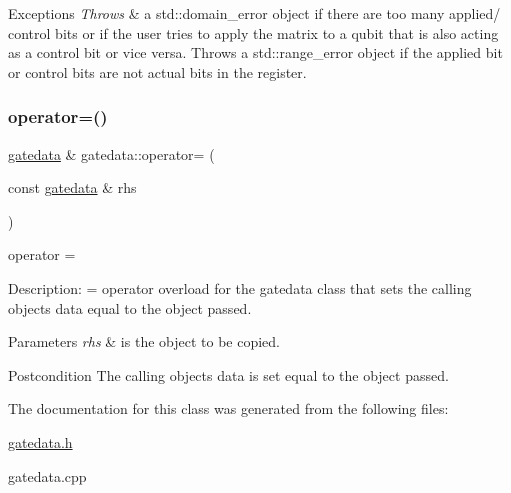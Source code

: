 \begin{DoxyExceptions}{Exceptions}
{\em Throws} & a std\+::domain\+\_\+error object if there are too many applied/ control bits or if the user tries to apply the matrix to a qubit that is also acting as a control bit or vice versa. Throws a std\+::range\+\_\+error object if the applied bit or control bits are not actual bits in the register. \\
\hline
\end{DoxyExceptions}
\mbox{\label{classgatedata_ab6386ea952bb7e620136049a5bd61211}} 
\subsubsection{\texorpdfstring{operator=()}{operator=()}}
{\footnotesize\ttfamily \hyperlink{classgatedata}{gatedata} \& gatedata\+::operator= (\begin{DoxyParamCaption}\item[{const \hyperlink{classgatedata}{gatedata} \&}]{rhs }\end{DoxyParamCaption})}



operator = 

Description\+: = operator overload for the gatedata class that sets the calling objects data equal to the object passed. 
\begin{DoxyParams}{Parameters}
{\em rhs} & is the object to be copied. \\
\hline
\end{DoxyParams}
\begin{DoxyPostcond}{Postcondition}
The calling objects data is set equal to the object passed. 
\end{DoxyPostcond}


The documentation for this class was generated from the following files\+:\begin{DoxyCompactItemize}
\item 
\hyperlink{gatedata_8h}{gatedata.\+h}\item 
gatedata.\+cpp\end{DoxyCompactItemize}
